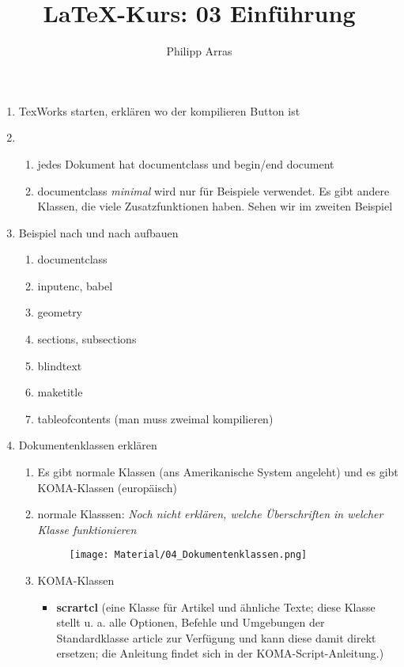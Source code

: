 \documentclass[11pt,a4paper]{scrartcl}
\author{Philipp Arras}
\title{\LaTeX -Kurs: 03 Einführung}
\begin{document}
\maketitle

\begin{enumerate}
\item TexWorks starten, erklären wo der kompilieren Button ist
\item 
	\begin{enumerate}
	\item jedes Dokument hat documentclass und begin/end document
	\item documentclass \emph{minimal} wird nur für Beispiele verwendet. Es gibt andere Klassen, die viele Zusatzfunktionen haben. Sehen wir im zweiten Beispiel
	\end{enumerate}
	
\item Beispiel nach und nach aufbauen
	
	\begin{enumerate}
	\item documentclass
	\item inputenc, babel
	\item geometry
	\item sections, subsections
	\item blindtext
	\item maketitle
	\item tableofcontents (man muss zweimal kompilieren)	
	\end{enumerate}
\item Dokumentenklassen erklären
	\begin{enumerate}
	\item Es gibt normale Klassen (ans Amerikanische System angeleht) und es gibt KOMA-Klassen (europäisch)
	\item normale Klasssen: \emph{Noch nicht erklären, welche Überschriften in welcher Klasse funktionieren} 
		\begin{figure}
		\centering
		\texttt{[image: Material/04\_Dokumentenklassen.png]}
		\end{figure}
	\item KOMA-Klassen
		\begin{itemize}
		\item \textbf{scrartcl}  (eine Klasse für Artikel und ähnliche Texte; diese Klasse stellt u. a. alle Optionen, Befehle und Umgebungen der Standardklasse article zur Verfügung und kann diese damit direkt ersetzen; die Anleitung findet sich in der KOMA-Script-Anleitung.)

\end{itemize}
\end{enumerate}
\end{enumerate}
\end{document}
